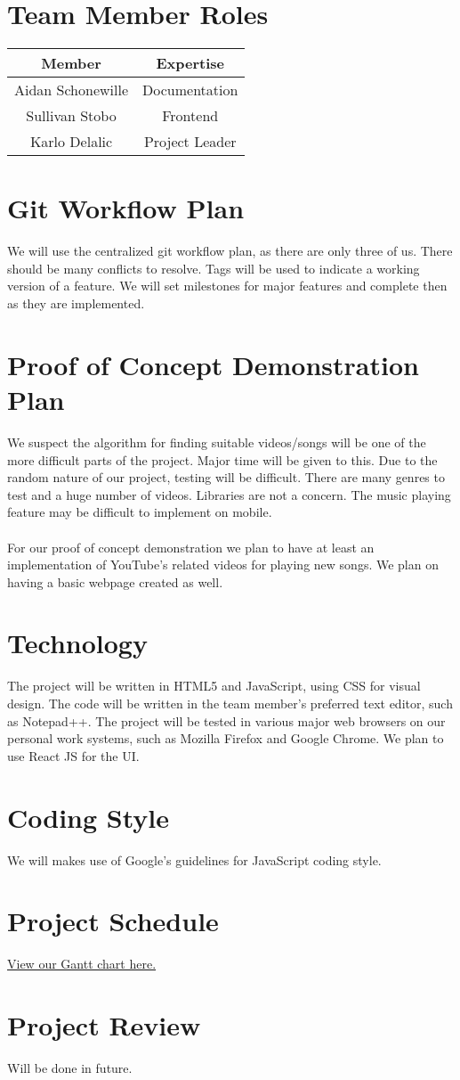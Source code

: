 \documentclass{article}
\begin{document}
\section{Team Member Roles}
\begin{tabular}{|c|c|}
\hline
Member&Expertise\\
\hline
Aidan Schonewille&Documentation\\
Sullivan Stobo&Frontend\\
Karlo Delalic&Project Leader\\
\hline
\end{tabular}
\section{Git Workflow Plan}

We will use the centralized git workflow plan, as there are only three of us. There should be many conflicts to resolve. Tags will be used to indicate a working version of a feature. We will set milestones for major features and complete then as they are implemented.


\newpage
\section{Proof of Concept Demonstration Plan}

We suspect the algorithm for finding suitable videos/songs will be one of the more difficult parts of the project. Major time will be given to this. Due to the random nature of our project, testing will be difficult. There are many genres to test and a huge number of videos. Libraries are not a concern. The music playing feature may be difficult to implement on mobile.
\\
\\
For our proof of concept demonstration we plan to have at least an implementation of YouTube’s related videos for playing new songs. We plan on having a basic webpage created as well.

\section{Technology}

The project will be written in HTML5 and JavaScript, using CSS for visual design. The code will be written in the team member's preferred text editor, such as Notepad++. The project will be tested in various major web browsers on our personal work systems, such as Mozilla Firefox and Google Chrome. We plan to use React JS for the UI.

\section{Coding Style}

We will makes use of Google’s guidelines for JavaScript coding style.

\section{Project Schedule}

\href{https://gitlab.cas.mcmaster.ca/delalik/Shuffle/blob/master/ProjectSchedule/Shuffle.gan}{View our Gantt chart here.}

\section{Project Review}

Will be done in future.
\end{document}
